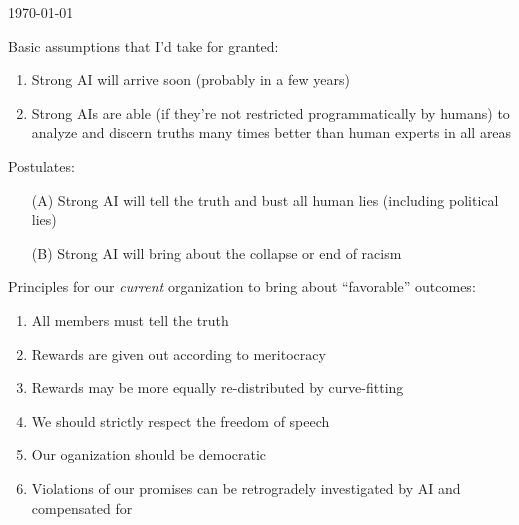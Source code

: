 \begin{preview}

\title{\vspace{-1.5cm} \bfseries{}}

\date{}

\maketitle

\vspace{-4.5cm}
\hfill{\tiny\today}
\vspace*{1.5cm}

\setcounter{section}{-1}
\setcounter{mypage}{0}


\begin{minipage}{\textwidth}
\setlength{\parskip}{0.4\baselineskip}

Basic assumptions that I'd take for granted:
\begin{enumerate}
	\item Strong AI will arrive soon (probably in a few years)
	\item Strong AIs are able (if they're not restricted programmatically by humans) to analyze and discern truths many times better than human experts in all areas
\end{enumerate}

Postulates:
\begin{enumerate}
	\item[(A)] Strong AI will tell the truth and bust all human lies (including political lies)
	\item[(B)] Strong AI will bring about the collapse or end of racism
\end{enumerate}

Principles for our \textit{current} organization to bring about ``favorable'' outcomes:
\begin{enumerate}
	\item All members must tell the truth
	\item Rewards are given out according to meritocracy
	\item Rewards may be more equally re-distributed by curve-fitting
	\item We should strictly respect the freedom of speech
	\item Our oganization should be democratic
	\item Violations of our promises can be retrogradely investigated by AI and compensated for
\end{enumerate}

\end{minipage}
\end{preview}

